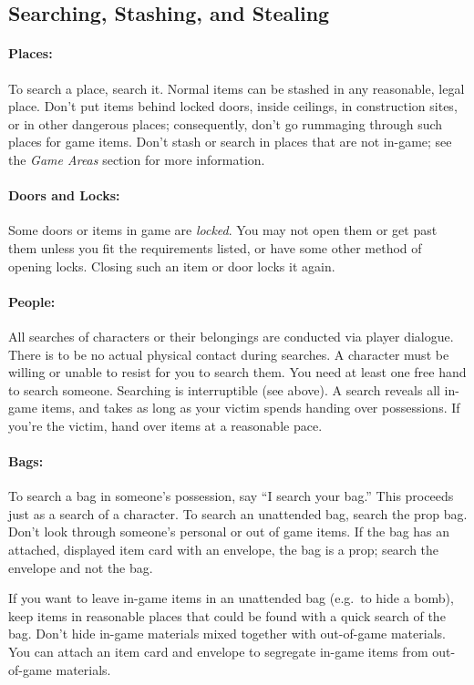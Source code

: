 \documentclass[sheet]{GL2020}
\begin{document}
\subsection{Searching, Stashing, and Stealing}

\paragraph{Places:} To search a place, search it.  Normal items can be stashed in any reasonable, legal place. Don't put items behind locked doors, inside ceilings, in construction sites, or in other dangerous places; consequently, don't go rummaging through such places for game items.  Don't stash or search in places that are not in-game; see the \emph{Game Areas} section for more information.

\paragraph{Doors and Locks:} Some doors or items in game are \emph{locked}. You may not open them or get past them unless you fit the requirements listed, or have some other method of opening locks. Closing such an item or door locks it again.

\paragraph{People:} All searches of characters or their belongings are conducted via player dialogue. There is to be no actual physical contact during searches. A character must be willing or unable to resist for you to search them.  You need at least one free hand to search someone. Searching is interruptible (see above).
A search reveals all in-game items, and takes as long as your victim spends handing over possessions. If you're the victim, hand over items at a reasonable pace.

\paragraph{Bags:} To search a bag in someone's possession, say ``I search your bag.''  This proceeds just as a search of a character. To search an unattended bag, search the prop bag. Don't look through someone's personal or out of game items. If the bag has an attached, displayed item card with an envelope, the bag is a prop; search the envelope and not the bag.

If you want to leave in-game items in an unattended bag (e.g.\ to hide a bomb), keep items in reasonable places that could be found with a quick search of the bag. Don't hide in-game materials mixed together with out-of-game materials. You can attach an item card and envelope to segregate in-game items from out-of-game materials.
\end{document}
